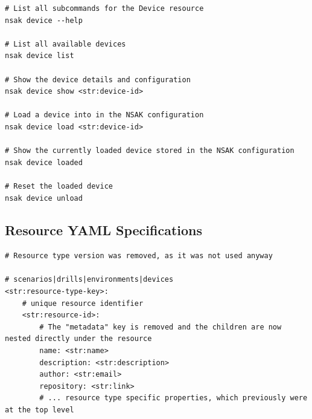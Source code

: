 \begin{listing}[H]
    \inputminted[firstline=12, lastline=30]{python}{../../../src/nsak/core/network/configuration.py}
    \inputminted[firstline=14, lastline=39]{python}{../../../src/nsak/core/device/device.py}
    \caption{Device Configuration Datastructures}
    \label{lst:device-configuration-datastructures}
\end{listing}

\begin{listing}[H]
    \begin{verbatim}
# List all subcommands for the Device resource
nsak device --help

# List all available devices
nsak device list

# Show the device details and configuration
nsak device show <str:device-id>

# Load a device into in the NSAK configuration
nsak device load <str:device-id>

# Show the currently loaded device stored in the NSAK configuration
nsak device loaded

# Reset the loaded device
nsak device unload
    \end{verbatim}
    \caption{Device Configuration CLI Management}
    \label{lst:device-configuration-cli-management}
\end{listing}

\subsection{Resource YAML Specifications}\label{subsec:appendix-resource-yaml-specifications}

\begin{listing}[H]
    \begin{verbatim}
# Resource type version was removed, as it was not used anyway

# scenarios|drills|environments|devices
<str:resource-type-key>:
    # unique resource identifier
    <str:resource-id>:
        # The "metadata" key is removed and the children are now nested directly under the resource
        name: <str:name>
        description: <str:description>
        author: <str:email>
        repository: <str:link>
        # ... resource type specific properties, which previously were at the top level
    \end{verbatim}
    \caption{Mergeable Resource YAML Specification}
    \label{lst:mergeable-resource-yaml-specification}
\end{listing}

